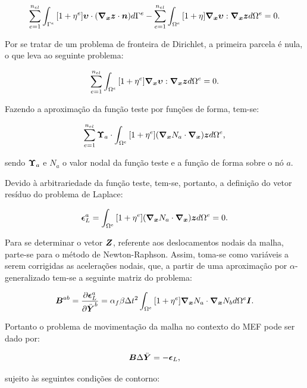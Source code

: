 \begin{equation}
    \sum_{e=1}^{n_{el}}{\int_{\Gamma^e}{[1+\eta^e]\boldsymbol{\upsilon}\cdot(\boldsymbol{\nabla_x}\boldsymbol{z}\cdot\boldsymbol{n}) d\Gamma^e}}-\sum_{e=1}^{n_{el}}{\int_{\Omega^e}{[1+\eta]\boldsymbol{\nabla_x}\boldsymbol{\upsilon}:\boldsymbol{\nabla_x}\boldsymbol{z} d\Omega^e}}=0\text{.}
\end{equation}

Por se tratar de um problema de fronteira de Dirichlet, a primeira parcela é nula, o que leva ao seguinte problema:

\begin{equation}
    \sum_{e=1}^{n_{el}}{\int_{\Omega^e}{[1+\eta^e]\boldsymbol{\nabla_x}\boldsymbol{\upsilon}:\boldsymbol{\nabla_x}\boldsymbol{z} d\Omega^e}}=0\text{.}
\end{equation}

Fazendo a aproximação da função teste por funções de forma, tem-se:

\begin{equation}
    \sum_{e=1}^{n_{el}}{\boldsymbol{\Upsilon}_a\cdot\int_{\Omega^e}{[1+\eta^e](\boldsymbol{\nabla_x} N_a\cdot\boldsymbol{\nabla_x})\boldsymbol{z} d\Omega^e}}\text{,}
\end{equation}

\noindent sendo $\boldsymbol{\Upsilon}_a$ e $N_a$ o valor nodal da função teste e a função de forma sobre o nó $a$.

Devido à arbitrariedade da função teste, tem-se, portanto, a definição do vetor resíduo do problema de Laplace:

\begin{equation}
    \boldsymbol{\epsilon}_L^a=\int_{\Omega^e}{[1+\eta^e](\boldsymbol{\nabla_x} N_a\cdot\boldsymbol{\nabla_x})\boldsymbol{z} d\Omega^e}=0\text{.}
    \label{eq:resLapl}
\end{equation}

Para se determinar o vetor $\boldsymbol{Z}$, referente aos deslocamentos nodais da malha, parte-se para o método de Newton-Raphson. Assim, toma-se como variáveis a serem corrigidas as acelerações nodais, que, a partir de uma aproximação por $\alpha$-generalizado tem-se a seguinte matriz do problema:

\begin{equation}
    \boldsymbol{B}^{ab}=\frac{\partial{\boldsymbol{\epsilon}_L^a}}{\partial{\ddot{\boldsymbol{Y}}^b}}=\alpha_f\beta\Delta t^2\int_{\Omega^e}{[1+\eta^e]\boldsymbol{\nabla_x} N_a\cdot\boldsymbol{\nabla_x} N_b d\Omega^e}\boldsymbol{I}\text{.}
    \label{eq:movMatriz}
\end{equation}

Portanto o problema de movimentação da malha no contexto do MEF pode ser dado por:

\begin{equation}
    \boldsymbol{B}\Delta\ddot{\boldsymbol{Y}}=-\boldsymbol{\epsilon}_L\text{,}
    \label{eq:sistLapl}
\end{equation}

\noindent sujeito às seguintes condições de contorno:

